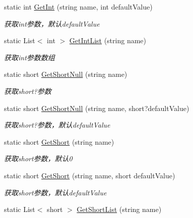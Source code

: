 \begin{DoxyCompactItemize}
static int \hyperlink{class_x_c_l_net_tools_1_1_string_hander_1_1_form_helper_ab1cbc4a5f6643c60beaf928081457b6f}{Get\+Int} (string name, int default\+Value)
\begin{DoxyCompactList}\small\item\em 获取int参数，默认default\+Value \end{DoxyCompactList}\item 
static List$<$ int $>$ \hyperlink{class_x_c_l_net_tools_1_1_string_hander_1_1_form_helper_a555eba05a8bdc2cab01e84b91e84f8c5}{Get\+Int\+List} (string name)
\begin{DoxyCompactList}\small\item\em 获取int参数数组 \end{DoxyCompactList}\item 
static short \hyperlink{class_x_c_l_net_tools_1_1_string_hander_1_1_form_helper_afe30b64436d0a1831330cd390f3f4b51}{Get\+Short\+Null} (string name)
\begin{DoxyCompactList}\small\item\em 获取short?参数 \end{DoxyCompactList}\item 
static short \hyperlink{class_x_c_l_net_tools_1_1_string_hander_1_1_form_helper_a23c16178ebaf6132bc6954dd098ed901}{Get\+Short\+Null} (string name, short?default\+Value)
\begin{DoxyCompactList}\small\item\em 获取short?参数，默认default\+Value \end{DoxyCompactList}\item 
static short \hyperlink{class_x_c_l_net_tools_1_1_string_hander_1_1_form_helper_a197c2283e3000030d40e7a50d10471f0}{Get\+Short} (string name)
\begin{DoxyCompactList}\small\item\em 获取short参数，默认0 \end{DoxyCompactList}\item 
static short \hyperlink{class_x_c_l_net_tools_1_1_string_hander_1_1_form_helper_a16b3f8a3141fb74656dc3c857da2099b}{Get\+Short} (string name, short default\+Value)
\begin{DoxyCompactList}\small\item\em 获取short参数，默认default\+Value \end{DoxyCompactList}\item 
static List$<$ short $>$ \hyperlink{class_x_c_l_net_tools_1_1_string_hander_1_1_form_helper_aa99502c5145f156f0e8b714d7ab4c308}{Get\+Short\+List} (string name)

\end{DoxyCompactItemize}

